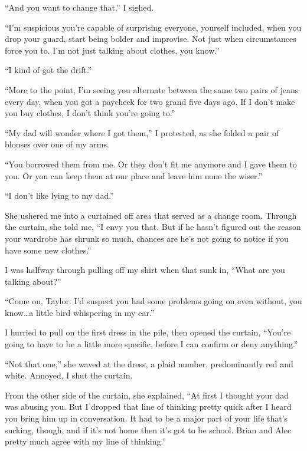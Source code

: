 ``And you want to change that.''  I sighed.



``I'm suspicious you're capable of surprising everyone, yourself included, when you drop your guard, start being bolder and improvise.  Not just when circumstances force you to.  I'm not just talking about clothes, you know.''



``I kind of got the drift.''



``More to the point, I'm seeing you alternate between the same two pairs of jeans every day, when you got a paycheck for two grand five days ago.  If I don't make you buy clothes, I don't think you're going to.''



``My dad will wonder where I got them,'' I protested, as she folded a pair of blouses over one of my arms.



``You borrowed them from me.  Or they don't fit me anymore and I gave them to you.  Or you can keep them at our place and leave him none the wiser.''



``I don't like lying to my dad.''



She ushered me into a curtained off area that served as a change room.  Through the curtain, she told me, ``I envy you that.  But if he hasn't figured out the reason your wardrobe has shrunk so much, chances are he's not going to notice if you have some new clothes.''



I was halfway through pulling off my shirt when that sunk in, ``What are you talking about?''



``Come on, Taylor.  I'd suspect you had some problems going on even without, you know\ldots a little bird whispering in my ear.''



I hurried to pull on the first dress in the pile, then opened the curtain, ``You're going to have to be a little more specific, before I can confirm or deny anything.''



``Not that one,'' she waved at the dress, a plaid number, predominantly red and white.  Annoyed, I shut the curtain.



From the other side of the curtain, she explained, ``At first I thought your dad was abusing you.  But I dropped that line of thinking pretty quick after I heard you bring him up in conversation.  It had to be a major part of your life that's sucking, though, and if it's not home then it's got to be school.  Brian and Alec pretty much agree with my line of thinking.''



